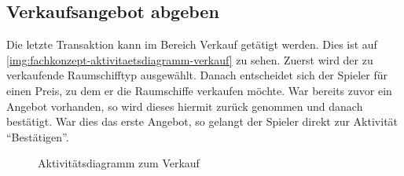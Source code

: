 \subsection{Verkaufsangebot abgeben}
\label{sec:fachkonzept-aktivitaetsdiagramm}

Die letzte Transaktion kann im Bereich Verkauf getätigt werden. Dies ist auf \vref{img:fachkonzept-aktivitaetsdiagramm-verkauf} zu sehen. Zuerst wird der zu verkaufende Raumschifftyp ausgewählt. Danach entscheidet sich der Spieler für einen Preis, zu dem er die Raumschiffe verkaufen möchte. War bereits zuvor ein Angebot vorhanden, so wird dieses hiermit zurück genommen und danach bestätigt. War dies das erste Angebot, so gelangt der Spieler direkt zur Aktivität “Bestätigen”.

\begin{figure}[h]
  \centering
  \caption{Aktivitätsdiagramm zum Verkauf}
  \label{img:fachkonzept-aktivitaetsdiagramm-verkauf}
\end{figure}